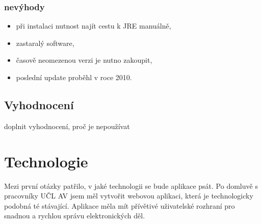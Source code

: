             \subsubsection{nevýhody}
                \begin{itemize}
                    \item při instalaci nutnost najít cestu k JRE manuálně,
                    \item zastaralý software,
                    \item časově neomezenou verzi je nutno zakoupit,
                    \item poslední update proběhl v roce 2010.
                \end{itemize}
        \subsection{Vyhodnocení}
            doplnit vyhodnocení, proč je nepoužívat
        
        
        

            
    \section{Technologie}
        Mezi první otázky patřilo, v jaké technologii se bude aplikace psát. Po domluvě s pracovníky UČL AV jsem měl vytvořit webovou aplikaci, která je technologicky podobná té stávající. Aplikace měla mít přívětivé uživatelské rozhraní pro snadnou a rychlou správu elektronických děl.
        
